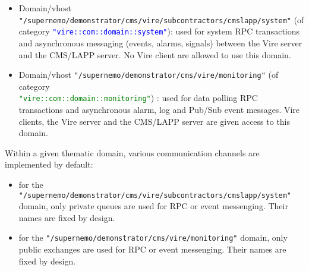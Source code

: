 \begin{itemize}

\item   Domain/vhost    \texttt{"/supernemo/demonstrator/cms/vire/subcontractors/cmslapp/system"}   (of
  category   \textcolor{blue}{\texttt{"vire::com::domain::system"}}):
  used for system RPC transactions and asynchronous messaging (events,
  alarms, signals)  between the Vire  server and the  CMS/LAPP server.
  No Vire client are allowed to use this domain.

\item    Domain/vhost   \texttt{"/supernemo/demonstrator/cms/vire/monitoring"}    (of
  category\\
  \textcolor{green}{\texttt{"vire::com::domain::monitoring"}})  : used
  for data polling RPC transactions and asynchronous alarm, log and Pub/Sub event messages.
  Vire  clients, the  Vire server  and the  CMS/LAPP server  are given
  access to this domain.


\end{itemize}

Within  a given  thematic domain,  various communication  channels
are implemented by default:

\begin{itemize}

\item for the \texttt{"/supernemo/demonstrator/cms/vire/subcontractors/cmslapp/system"} domain,
  only private queues are used for RPC or event messenging. Their names are fixed by design.

\item for the \texttt{"/supernemo/demonstrator/cms/vire/monitoring"} domain,
  only public exchanges are used for RPC or event messenging. Their names are fixed by design.

\end{itemize}


